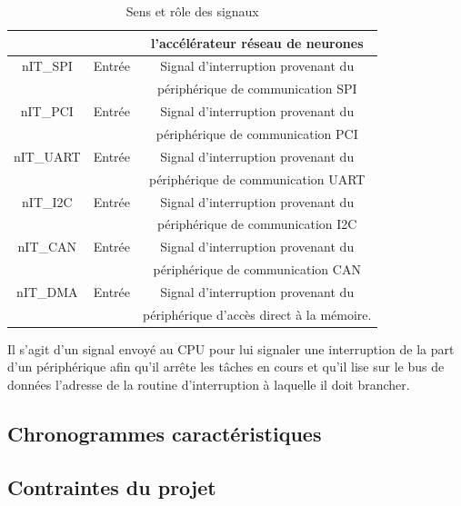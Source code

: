 \begin{table}[H]
\begin{tabular}{|c|c|c|}
		& & l'accélérateur réseau de neurones\\
		\hline
		nIT\_SPI & Entrée & Signal d'interruption provenant du \\
		& & périphérique de communication SPI\\
		\hline
		nIT\_PCI & Entrée & Signal d'interruption provenant du \\
		& & périphérique de communication PCI\\
		\hline
		nIT\_UART & Entrée & Signal d'interruption provenant du \\
		& & périphérique de communication UART\\
		\hline
		nIT\_I2C & Entrée & Signal d'interruption provenant du \\
		& & périphérique de communication I2C\\
		\hline
		nIT\_CAN & Entrée & Signal d'interruption provenant du \\
		& & périphérique de communication CAN\\
		\hline
		nIT\_DMA & Entrée & Signal d'interruption provenant du \\
		& & périphérique d'accès direct à la mémoire.\\
		\hline
	\end{tabular}
	\caption{Sens et rôle des signaux}
	\label{tab:sens_role_signaux}
\end{table}
	
Il s'agit d'un signal envoyé au CPU pour lui signaler une interruption de la part d'un périphérique afin qu'il arrête les tâches en cours et qu'il lise sur le bus de données l'adresse de la routine d'interruption à laquelle il doit brancher.


\subsection{Chronogrammes caractéristiques}

\subsection{Contraintes du projet}

